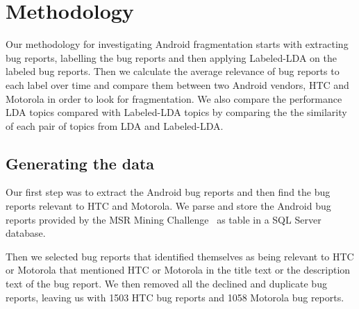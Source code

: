 \documentclass[10pt, conference, compsocconf]{IEEEtran}
\begin{document}
\section{Methodology}
\label{sec:methodology}

Our methodology for investigating Android fragmentation starts with extracting
bug reports, labelling the bug reports and then applying
Labeled-LDA on the labeled bug reports.
Then 
 we calculate the average relevance of bug reports to each label
over time\cite{Hindle} and compare them between two Android vendors,
HTC and Motorola in order to look for fragmentation.
We also compare the performance LDA topics compared with
Labeled-LDA topics by comparing the 
the similarity of each pair of
topics from LDA and Labeled-LDA.

\subsection{Generating the data}



Our first step was to extract the Android bug reports and then find
the bug reports relevant to HTC and Motorola.  We parse and store the
Android bug reports provided by the MSR Mining
Challenge~\cite{MSRChallenge2012} as table in a SQL Server database.


Then we selected bug reports that identified themselves as being
relevant to HTC or Motorola that mentioned HTC or
Motorola in the title text or the description text of the bug report.  
We then removed all the declined and duplicate bug reports, leaving us
with 1503 HTC bug reports and 1058 Motorola bug reports.
\end{document}
